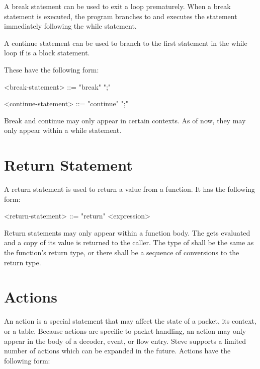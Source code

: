 A break statement can be used to exit a loop prematurely. When a break statement is executed, the program branches to and executes the statement immediately following the while statement.

A continue statement can be used to branch to the first statement in the while loop if  is a block statement. 

These have the following form:

\begin{minip}
\begin{grammar}
<break-statement> ::= "break" ";"

<continue-statement> ::= "continue" ";"
\end{grammar}
\end{minip}

Break and continue may only appear in certain contexts. As of now, they may only appear within a while statement.

\section{Return Statement} \label{guide:return_stmt}

A return statement is used to return a value from a function. It has the following form:

\begin{minip}
\begin{grammar}
<return-statement> ::= "return" <expression>
\end{grammar}
\end{minip}

Return statements may only appear within a function body. The  gets evaluated and a copy of its value is returned to the caller. The type of  shall be the same as the function's return type, or there shall be a sequence of conversions to the return type.

\section{Actions} \label{guide:action}

An action is a special statement that may affect the state of a packet, its context, or a table. Because actions are specific to packet handling, an action may only appear in the body of a decoder, event, or flow entry. Steve supports a limited number of actions which can be expanded in the future. Actions have the following form:

